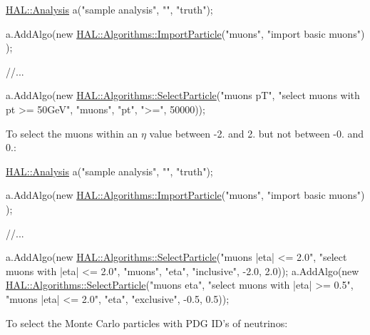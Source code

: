 \begin{DoxyCode}
\hyperlink{class_h_a_l_1_1_analysis}{HAL::Analysis} a(\textcolor{stringliteral}{"sample analysis"}, \textcolor{stringliteral}{""}, \textcolor{stringliteral}{"truth"});

a.AddAlgo(\textcolor{keyword}{new} \hyperlink{class_h_a_l_1_1_algorithms_1_1_import_particle}{HAL::Algorithms::ImportParticle}(\textcolor{stringliteral}{"muons"}, \textcolor{stringliteral}{"import basic muons"})
      );

\textcolor{comment}{//...}

a.AddAlgo(\textcolor{keyword}{new} \hyperlink{class_h_a_l_1_1_algorithms_1_1_select_particle}{HAL::Algorithms::SelectParticle}(\textcolor{stringliteral}{"muons pT"}, \textcolor{stringliteral}{"select muons with
       pt >= 50GeV"}, 
                                              \textcolor{stringliteral}{"muons"},
                                              \textcolor{stringliteral}{"pt"}, \textcolor{stringliteral}{">="}, 50000));
\end{DoxyCode}
 To select the muons within an $ \eta $ value between -\/2. and 2. but not between -\/0. and 0.\-:


\begin{DoxyCode}
\hyperlink{class_h_a_l_1_1_analysis}{HAL::Analysis} a(\textcolor{stringliteral}{"sample analysis"}, \textcolor{stringliteral}{""}, \textcolor{stringliteral}{"truth"});

a.AddAlgo(\textcolor{keyword}{new} \hyperlink{class_h_a_l_1_1_algorithms_1_1_import_particle}{HAL::Algorithms::ImportParticle}(\textcolor{stringliteral}{"muons"}, \textcolor{stringliteral}{"import basic muons"})
      );

\textcolor{comment}{//...}

a.AddAlgo(\textcolor{keyword}{new} \hyperlink{class_h_a_l_1_1_algorithms_1_1_select_particle}{HAL::Algorithms::SelectParticle}(\textcolor{stringliteral}{"muons |eta| <= 2.0"}, \textcolor{stringliteral}{"select
       muons with |eta| <= 2.0"}, 
                                              \textcolor{stringliteral}{"muons"},
                                              \textcolor{stringliteral}{"eta"}, \textcolor{stringliteral}{"inclusive"}, -2.0, 2.0));
a.AddAlgo(\textcolor{keyword}{new} \hyperlink{class_h_a_l_1_1_algorithms_1_1_select_particle}{HAL::Algorithms::SelectParticle}(\textcolor{stringliteral}{"muons eta"}, \textcolor{stringliteral}{"select muons
       with |eta| >= 0.5"}, 
                                              \textcolor{stringliteral}{"muons |eta| <= 2.0"},
                                              \textcolor{stringliteral}{"eta"}, \textcolor{stringliteral}{"exclusive"}, -0.5, 0.5));
\end{DoxyCode}
 To select the Monte Carlo particles with P\-D\-G I\-D's of neutrinos\-:


